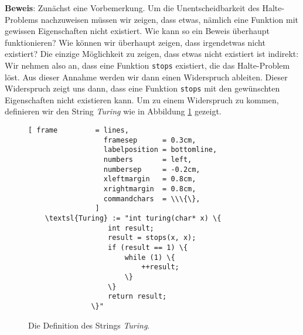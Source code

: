 \noindent
\textbf{Beweis}:  Zun\"achst eine Vorbemerkung.  Um die Unentscheidbarkeit des
Halte-Problems nachzuweisen m\"ussen wir zeigen, dass etwas, n\"amlich eine Funktion mit
gewissen Eigenschaften nicht existiert.  Wie kann so ein Beweis \"uberhaupt funktionieren?
Wie k\"onnen wir \"uberhaupt zeigen, dass irgendetwas nicht existiert?
Die einzige M\"oglichkeit zu zeigen, dass etwas nicht existiert ist indirekt:
Wir nehmen also an, dass eine Funktion \texttt{stops} existiert, die das Halte-Problem l\"ost.
Aus dieser Annahme werden wir dann einen Widerspruch ableiten.  Dieser Widerspruch zeigt
uns dann, dass eine Funktion \texttt{stops} mit den gew\"unschten Eigenschaften nicht
existieren kann.
Um zu einem Widerspruch zu kommen, definieren wir den String \textsl{Turing} wie in Abbildung
\ref{fig:turing-string} gezeigt.

\begin{figure}[!h]
  \centering
\begin{Verbatim}[ frame         = lines, 
                  framesep      = 0.3cm, 
                  labelposition = bottomline,
                  numbers       = left,
                  numbersep     = -0.2cm,
                  xleftmargin   = 0.8cm,
                  xrightmargin  = 0.8cm,
                  commandchars  = \\\{\},
                ]
    \textsl{Turing} := "int turing(char* x) \{
                   int result;
                   result = stops(x, x);
                   if (result == 1) \{
                       while (1) \{
                           ++result;
                       \}
                   \}
                   return result;
               \}"
\end{Verbatim}
  \vspace*{-0.3cm}
  \caption{Die Definition des Strings \textsl{Turing}.}
  \label{fig:turing-string}
\end{figure}

